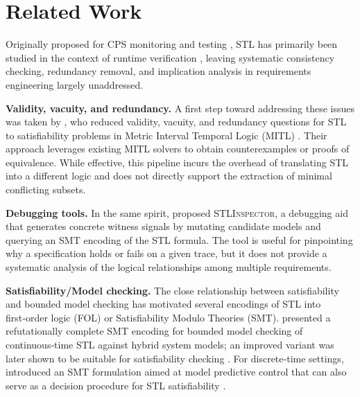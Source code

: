 \documentclass{easychair}
\begin{document}
\section{Related Work}
\label{sec:related-work}

Originally proposed for CPS monitoring and testing \citep{MalerN04}, STL has primarily been studied in the context of runtime verification \citep{BartocciDDFMNS18}, leaving systematic consistency checking, redundancy removal, and implication analysis in requirements engineering largely unaddressed.

\noindent \textbf{Validity, vacuity, and redundancy.}
A first step toward addressing these issues was taken by \citet{Dokhanchi}, who reduced validity, vacuity, and redundancy questions for STL to satisfiability problems in Metric Interval Temporal Logic (MITL) \citep{AlurFH96}.  Their approach leverages existing MITL solvers \citep{BersaniRP13} to obtain counterexamples or proofs of equivalence.  While effective, this pipeline incurs the overhead of translating STL into a different logic and does not directly support the extraction of minimal conflicting subsets.

\noindent \textbf{Debugging tools.}
In the same spirit, \citet{RoehmHM17} proposed \textsc{STLInspector}, a debugging aid that generates concrete witness signals by mutating candidate models and querying an SMT encoding of the STL formula.  The tool is useful for pinpointing why a specification holds or fails on a given trace, but it does not provide a systematic analysis of the logical relationships among multiple requirements.

\noindent \textbf{Satisfiability/Model checking.}
The close relationship between satisfiability and bounded model checking has motivated several encodings of STL into first‑order logic (FOL) or Satisfiability Modulo Theories (SMT).  \citet{BaeLee19} presented a refutationally complete SMT encoding for bounded model checking of continuous‑time STL against hybrid system models; an improved variant was later shown to be suitable for satisfiability checking \citep{LeeYB21}.  For discrete‑time settings, \citet{RamanDMMSS14} introduced an SMT formulation aimed at model predictive control that can also serve as a decision procedure for STL satisfiability \citep{MelaniBC25}.

\end{document}
